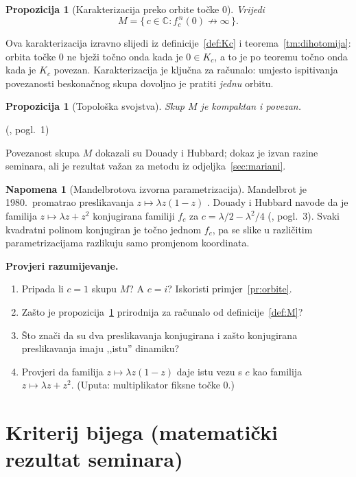 \documentclass[11pt,a4paper]{article}
\theoremstyle{definition}
\newtheorem*{napomena}{Napomena}
\theoremstyle{plain}
\newtheorem{propozicija}[definicija]{Propozicija}
\newenvironment{pitanja}
  {\par\noindent\textbf{\color{orange!70!black}Provjeri razumijevanje.}
   \begin{enumerate}[label=\arabic*., nosep]}
  {\end{enumerate}\medskip}
\newcommand{\mjesto}[2]{{\small(\cite{#1}, #2)}}
\newcommand{\C}{\mathbb{C}}
\begin{document}
\begin{propozicija}[Karakterizacija preko orbite točke $0$]
\label{prop:orbita0}
Vrijedi
\[
  M = \{\, c \in \C : f_c^{\,n}(0) \not\to \infty \,\}.
\]
\end{propozicija}

Ova karakterizacija izravno slijedi iz definicije~\ref{def:Kc} i
teorema~\ref{tm:dihotomija}: orbita točke $0$ ne bježi točno onda kada je
$0 \in K_c$, a to je po teoremu točno onda kada je $K_c$ povezan.
Karakterizacija je ključna za računalo: umjesto ispitivanja povezanosti
beskonačnog skupa dovoljno je pratiti \emph{jednu} orbitu.

\begin{propozicija}[Topološka svojstva]
\label{prop:topologija}
Skup $M$ je kompaktan i povezan.
\end{propozicija}
\mjesto{douady_hubbard_orsay}{pogl.~1}

Povezanost skupa $M$ dokazali su Douady i Hubbard; dokaz je izvan razine
seminara, ali je rezultat važan za metodu iz odjeljka~\ref{sec:mariani}.

\begin{napomena}[Mandelbrotova izvorna parametrizacija]
Mandelbrot je 1980.\ promatrao preslikavanja $z \mapsto \lambda z(1 - z)$
\cite{mandelbrot1980}. Douady i Hubbard navode da je familija
$z \mapsto \lambda z + z^2$ konjugirana familiji $f_c$ za
$c = \lambda/2 - \lambda^2/4$ \mjesto{douady_hubbard_orsay}{pogl.~3}.
Svaki kvadratni polinom konjugiran je točno jednom $f_c$, pa se slike u
različitim parametrizacijama razlikuju samo promjenom koordinata.
\end{napomena}

\begin{pitanja}
  \item Pripada li $c = 1$ skupu $M$? A $c = i$? Iskoristi primjer~\ref{pr:orbite}.
  \item Zašto je propozicija~\ref{prop:orbita0} prirodnija za računalo od
        definicije~\ref{def:M}?
  \item Što znači da su dva preslikavanja konjugirana i zašto konjugirana
        preslikavanja imaju ,,istu'' dinamiku?
  \item Provjeri da familija $z \mapsto \lambda z(1-z)$ daje istu vezu s $c$
        kao familija $z \mapsto \lambda z + z^2$. (Uputa: multiplikator fiksne
        točke $0$.)
\end{pitanja}

\section{Kriterij bijega (matematički rezultat seminara)}
\label{sec:kriterij}
\end{document}
